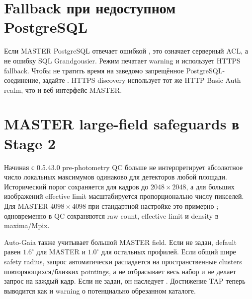 \section{Fallback при недоступном PostgreSQL}

Если MASTER PostgreSQL отвечает ошибкой , это означает серверный ACL, а не ошибку SQL Grandgousier. Режим  печатает warning и использует HTTPS fallback. Чтобы не тратить время на заведомо запрещённое PostgreSQL-соединение, задайте . HTTPS discovery использует тот же HTTP Basic Auth realm, что и веб-интерфейс MASTER.


\section{MASTER large-field safeguards в Stage 2}

Начиная с 0.5.43.0 pre-photometry QC больше не интерпретирует абсолютное число локальных максимумов одинаково для детекторов любой площади. Исторический порог  сохраняется для кадров до $2048\times2048$, а для больших изображений effective limit масштабируется пропорционально числу пикселей. Для MASTER $4098\times4098$ при стандартной настройке это примерно ; одновременно в QC сохраняются raw count, effective limit и density в maxima/Mpix.

Auto-Gaia также учитывает большой MASTER field. Если  не задан, default равен $1.6^\circ$ для MASTER и $1.0^\circ$ для остальных профилей. Если общий  шире safety radius, запрос автоматически распадается на пространственные clusters повторяющихся/близких pointings, а не отбрасывает весь набор и не делает запрос на каждый кадр. Если  не задан, он наследует . Достижение TAP  теперь выводится как  и warning о потенциально обрезанном каталоге.
